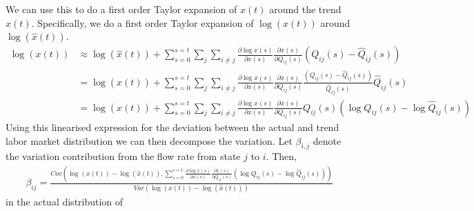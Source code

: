 We can use this to do a first order Taylor expansion of $x(t)$ around the trend $\hat{x}(t)$. Specifically, we do a first order Taylor expansion of $\log \left( x(t) \right)$ around $\log \left( \hat{x}(t) \right)$. 
\begin{align}
	\log \left( x(t) \right) &\approx \log \left( \hat{x}(t) \right)+ \sum_{s=0}^{s=t} \sum_{j} \sum_{i \neq j} \frac{\partial \log x(s)}{\partial x(s)} \frac{\partial x(s)}{\partial Q_{ij}(s)}
	\left(Q_{ij}(s)-\hat{Q}_{ij}(s)\right) \nonumber \\
	&= \log \left( \hat{x}(t) \right)+\sum_{s=0}^{s=t}\sum_{j} \sum_{i \neq j}\frac{\partial \log x(s)}{\partial x(s)} \frac{\partial x(s)}{\partial Q_{ij}(s)}
	\frac{\left(Q_{ij}(s)-\hat{Q}_{ij}(s)\right)}{\hat{Q}_{ij}(s)}\hat{Q}_{ij}(s) \nonumber \\
	&= \log \left( \hat{x}(t) \right)+\sum_{s=0}^{s=t}\sum_{j} \sum_{i \neq j}\frac{\partial \log x(s)}{\partial x(s)} \frac{\partial x(s)}{\partial Q_{ij}(s)}Q_{ij}(s)
\left( \log Q_{ij}(s) - \log \hat{Q}_{ij}(s)  \right) 
\end{align}
Using this linearised expression for the deviation between the actual and trend labor market distribution we can then decompose the variation. Let $\beta_{i,j}$ denote the variation contribution from the flow rate from state $j$ to $i$. Then, 
\begin{align}
	\beta_{ij}=\frac{Cov \left( \log \left( x(t) \right) -\log \left( \hat{x}(t) \right),\sum_{s=0}^{s=t} \frac{\partial \log x(s)}{\partial x(s)} \frac{\partial x(s)}{\partial Q_{ij}(s)}
\left( \log Q_{ij}(s) - \log \hat{Q}_{ij}(s)  \right) \right)}{Var \left( \log \left( x(t) \right) -\log \left( \hat{x}(t) \right) \right)}
\end{align}
 in the actual distribution of


